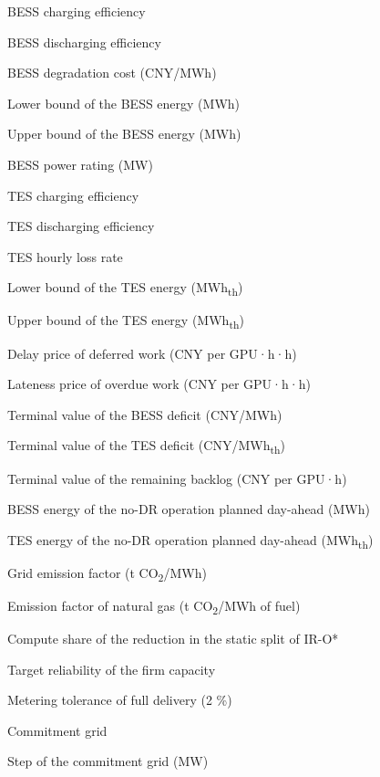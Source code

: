 \documentclass[a4paper,twocolumn,fleqn,10pt]{article}
\begin{document}
{\begin{nomlist}
\item[{\(\eta_c\)}] BESS charging efficiency
\item[{\(\eta_d\)}] BESS discharging efficiency
\item[{\(c^{deg}\)}] BESS degradation cost (CNY/MWh)
\item[{\(\underline E\)}] Lower bound of the BESS energy (MWh)
\item[{\(\bar E\)}] Upper bound of the BESS energy (MWh)
\item[{\(\bar P^{B}\)}] BESS power rating (MW)
\item[{\(\eta^T_c\)}] TES charging efficiency
\item[{\(\eta^T_d\)}] TES discharging efficiency
\item[{\(\sigma\)}] TES hourly loss rate
\item[{\(\underline S\)}] Lower bound of the TES energy (MWh\textsubscript{th})
\item[{\(\bar S\)}] Upper bound of the TES energy (MWh\textsubscript{th})
\item[{\(c^{jct}\)}] Delay price of deferred work (CNY per GPU·h·h)
\item[{\(c^{late}\)}] Lateness price of overdue work (CNY per GPU·h·h)
\item[{\(c^{E}\)}] Terminal value of the BESS deficit (CNY/MWh)
\item[{\(c^{S}\)}] Terminal value of the TES deficit (CNY/MWh\textsubscript{th})
\item[{\(c^{B}\)}] Terminal value of the remaining backlog (CNY per GPU·h)
\item[{\(E^{ref}_t\)}] BESS energy of the no-DR operation planned day-ahead (MWh)
\item[{\(S^{ref}_t\)}] TES energy of the no-DR operation planned day-ahead (MWh\textsubscript{th})
\item[{\(e^{grid}\)}] Grid emission factor (t CO\textsubscript{2}/MWh)
\item[{\(e^{gas}\)}] Emission factor of natural gas (t CO\textsubscript{2}/MWh of fuel)
\item[{\(\alpha\)}] Compute share of the reduction in the static split of IR-O*
\item[{\(\rho\)}] Target reliability of the firm capacity
\item[{\(\epsilon_f\)}] Metering tolerance of full delivery (2 \%)
\item[{\(\mathcal G\)}] Commitment grid
\item[{\(\Delta_{\mathcal G}\)}] Step of the commitment grid (MW)

\end{nomlist}}
\end{document}
